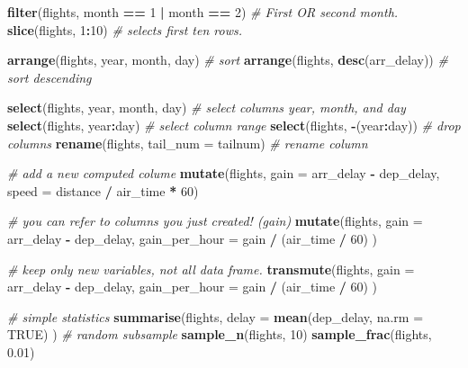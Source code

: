 \documentclass[]{book}
\newenvironment{Shaded}{\begin{snugshade}}{\end{snugshade}}
\newcommand{\KeywordTok}[1]{\textcolor[rgb]{0.13,0.29,0.53}{\textbf{#1}}}
\newcommand{\DataTypeTok}[1]{\textcolor[rgb]{0.13,0.29,0.53}{#1}}
\newcommand{\DecValTok}[1]{\textcolor[rgb]{0.00,0.00,0.81}{#1}}
\newcommand{\FloatTok}[1]{\textcolor[rgb]{0.00,0.00,0.81}{#1}}
\newcommand{\StringTok}[1]{\textcolor[rgb]{0.31,0.60,0.02}{#1}}
\newcommand{\CommentTok}[1]{\textcolor[rgb]{0.56,0.35,0.01}{\textit{#1}}}
\newcommand{\OtherTok}[1]{\textcolor[rgb]{0.56,0.35,0.01}{#1}}
\newcommand{\OperatorTok}[1]{\textcolor[rgb]{0.81,0.36,0.00}{\textbf{#1}}}
\newcommand{\NormalTok}[1]{#1}
\theoremstyle{definition}
\theoremstyle{definition}
\theoremstyle{definition}
\theoremstyle{remark}
\begin{document}
\begin{Shaded}
\begin{Highlighting}[]
\KeywordTok{filter}\NormalTok{(flights, month }\OperatorTok{==}\StringTok{ }\DecValTok{1} \OperatorTok{|}\StringTok{ }\NormalTok{month }\OperatorTok{==}\StringTok{ }\DecValTok{2}\NormalTok{) }\CommentTok{# First OR second month.}
\KeywordTok{slice}\NormalTok{(flights, }\DecValTok{1}\OperatorTok{:}\DecValTok{10}\NormalTok{) }\CommentTok{# selects first ten rows.}

\KeywordTok{arrange}\NormalTok{(flights, year, month, day) }\CommentTok{# sort}
\KeywordTok{arrange}\NormalTok{(flights, }\KeywordTok{desc}\NormalTok{(arr_delay)) }\CommentTok{# sort descending}

\KeywordTok{select}\NormalTok{(flights, year, month, day) }\CommentTok{# select columns year, month, and day}
\KeywordTok{select}\NormalTok{(flights, year}\OperatorTok{:}\NormalTok{day) }\CommentTok{# select column range}
\KeywordTok{select}\NormalTok{(flights, }\OperatorTok{-}\NormalTok{(year}\OperatorTok{:}\NormalTok{day)) }\CommentTok{# drop columns}
\KeywordTok{rename}\NormalTok{(flights, }\DataTypeTok{tail_num =}\NormalTok{ tailnum) }\CommentTok{# rename column}

\CommentTok{# add a new computed colume}
\KeywordTok{mutate}\NormalTok{(flights,}
  \DataTypeTok{gain =}\NormalTok{ arr_delay }\OperatorTok{-}\StringTok{ }\NormalTok{dep_delay,}
  \DataTypeTok{speed =}\NormalTok{ distance }\OperatorTok{/}\StringTok{ }\NormalTok{air_time }\OperatorTok{*}\StringTok{ }\DecValTok{60}\NormalTok{) }

\CommentTok{# you can refer to columns you just created! (gain)}
\KeywordTok{mutate}\NormalTok{(flights,}
  \DataTypeTok{gain =}\NormalTok{ arr_delay }\OperatorTok{-}\StringTok{ }\NormalTok{dep_delay,}
  \DataTypeTok{gain_per_hour =}\NormalTok{ gain }\OperatorTok{/}\StringTok{ }\NormalTok{(air_time }\OperatorTok{/}\StringTok{ }\DecValTok{60}\NormalTok{)}
\NormalTok{)}

\CommentTok{# keep only new variables, not all data frame.}
\KeywordTok{transmute}\NormalTok{(flights,}
  \DataTypeTok{gain =}\NormalTok{ arr_delay }\OperatorTok{-}\StringTok{ }\NormalTok{dep_delay,}
  \DataTypeTok{gain_per_hour =}\NormalTok{ gain }\OperatorTok{/}\StringTok{ }\NormalTok{(air_time }\OperatorTok{/}\StringTok{ }\DecValTok{60}\NormalTok{)}
\NormalTok{)}

\CommentTok{# simple statistics}
\KeywordTok{summarise}\NormalTok{(flights,}
  \DataTypeTok{delay =} \KeywordTok{mean}\NormalTok{(dep_delay, }\DataTypeTok{na.rm =} \OtherTok{TRUE}\NormalTok{)}
\NormalTok{  )}
\CommentTok{# random subsample }
\KeywordTok{sample_n}\NormalTok{(flights, }\DecValTok{10}\NormalTok{) }
\KeywordTok{sample_frac}\NormalTok{(flights, }\FloatTok{0.01}\NormalTok{) }
\end{Highlighting}
\end{Shaded}
\end{document}
